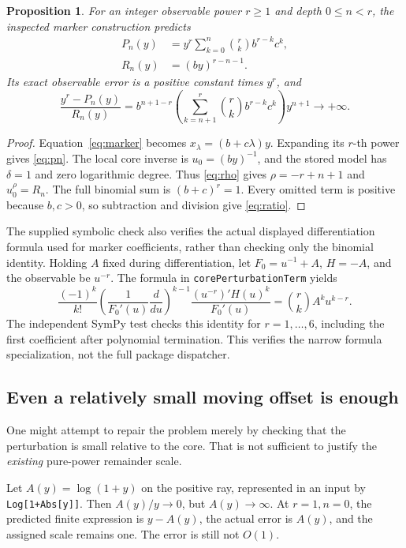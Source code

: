 \documentclass[11pt,letterpaper]{article}
\newcommand{\code}[1]{\nolinkurl{#1}}
\newtheorem{proposition}{Proposition}[section]
\begin{document}
\begin{proposition}\label{prop:linear}
For an integer observable power \(r\ge1\) and depth \(0\le n<r\), the inspected marker construction predicts
\begin{align}
 P_n(y)&=y^r\sum_{k=0}^{n}\binom rk b^{r-k}c^k,\label{eq:pn}\\
 R_n(y)&=(by)^{r-n-1}.
\end{align}
Its exact observable error is a positive constant times \(y^r\), and
\begin{equation}
 \frac{y^r-P_n(y)}{R_n(y)}
 =b^{n+1-r}\left(\sum_{k=n+1}^{r}\binom rk b^{r-k}c^k\right)y^{n+1}
 \longrightarrow+\infty.
 \label{eq:ratio}
\end{equation}
\end{proposition}
\begin{proof}
Equation~\eqref{eq:marker} becomes \(x_\lambda=(b+c\lambda)y\). Expanding its \(r\)-th power gives \eqref{eq:pn}. The local core inverse is \(u_0=(by)^{-1}\), and the stored model has \(\delta=1\) and zero logarithmic degree. Thus \eqref{eq:rho} gives \(\rho=-r+n+1\) and \(u_0^\rho=R_n\). The full binomial sum is \((b+c)^r=1\). Every omitted term is positive because \(b,c>0\), so subtraction and division give \eqref{eq:ratio}.
\end{proof}

The supplied symbolic check also verifies the actual displayed differentiation formula used for marker coefficients, rather than checking only the binomial identity. Holding \(A\) fixed during differentiation, let \(F_0=u^{-1}+A\), \(H=-A\), and the observable be \(u^{-r}\). The formula in \code{corePerturbationTerm} yields
\[
 \frac{(-1)^k}{k!}
 \left(\frac{1}{F_0'(u)}\frac{d}{du}\right)^{k-1}
 \frac{(u^{-r})'H(u)^k}{F_0'(u)}
 =\binom rk A^k u^{k-r}.
\]
The independent SymPy test checks this identity for \(r=1,\ldots,6\), including the first coefficient after polynomial termination. This verifies the narrow formula specialization, not the full package dispatcher.

\subsection{Even a relatively small moving offset is enough}
One might attempt to repair the problem merely by checking that the perturbation is small relative to the core. That is not sufficient to justify the \emph{existing} pure-power remainder scale.

Let \(A(y)=\log(1+y)\) on the positive ray, represented in an input by \code{Log[1+Abs[y]]}. Then \(A(y)/y\to0\), but \(A(y)\to\infty\). At \(r=1,n=0\), the predicted finite expression is \(y-A(y)\), the actual error is \(A(y)\), and the assigned scale remains one. The error is still not \(O(1)\).
\end{document}
